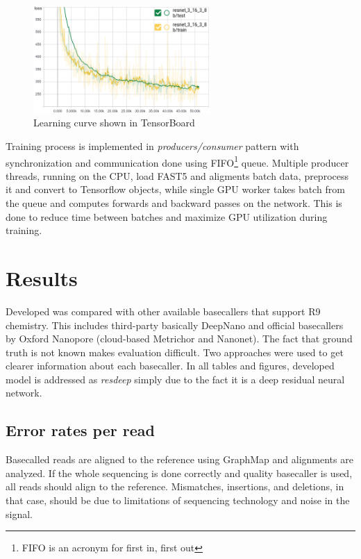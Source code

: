 \documentclass[times, utf8, diplomski, numeric, english]{fer}
\begin{document}
\begin{figure}[!ht]
	\begin{center}
		\includegraphics[width=0.6\textwidth]{./imgs/train_tb.png}
		\caption{Learning curve shown in TensorBoard}
		\label{fg:learn}
	\end{center}
\end{figure}

Training process is implemented in \textit{producers/consumer} pattern with synchronization and communication done using FIFO\footnote{FIFO is an acronym for first in, first out} queue. Multiple producer threads, running on the CPU, load FAST5 and aligments batch data, preprocess it and convert to Tensorflow objects, while single GPU worker takes batch from the queue and computes forwards and backward passes on the network. This is done to reduce time between batches and maximize GPU utilization during training. 




\chapter{Results}
Developed was compared with other available basecallers that support R9 chemistry. This includes third-party basically DeepNano and official basecallers by Oxford Nanopore (cloud-based Metrichor and Nanonet).
The fact that ground truth is not known makes evaluation difficult. Two approaches were used to get clearer information about each basecaller.
In all tables and figures, developed model is addressed as \textit{resdeep} simply due to the fact it is a deep residual neural network.



\section{Error rates per read}

Basecalled reads are aligned to the reference using GraphMap and alignments are analyzed. If the whole sequencing is done correctly and quality basecaller is used, all reads should align to the reference. Mismatches, insertions, and deletions, in that case, should be due to limitations of sequencing technology and noise in the signal.
\end{document}
